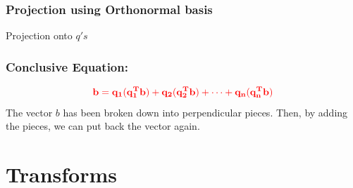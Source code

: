 \documentclass{beamer}
\newtheorem{Key points}{Key points}
\begin{document}
\begin{frame}
  \frametitle{Projection using Orthonormal basis}
Projection onto $q's$
\end{frame}
\begin{frame}
  \frametitle{Conclusive Equation: }
  \begin{center}
  \begin{equation*}
    {\color{red}\mathbf{b=q_1(q_1^Tb)+q_2(q_2^Tb)+\cdots+q_n(q_n^Tb)}}
  \end{equation*}
\large{The vector $b$ has been broken down into perpendicular pieces. Then, by adding the pieces, we can put back the vector again.}
\end{center}
\end{frame}
\section{Transforms}
\end{document}
